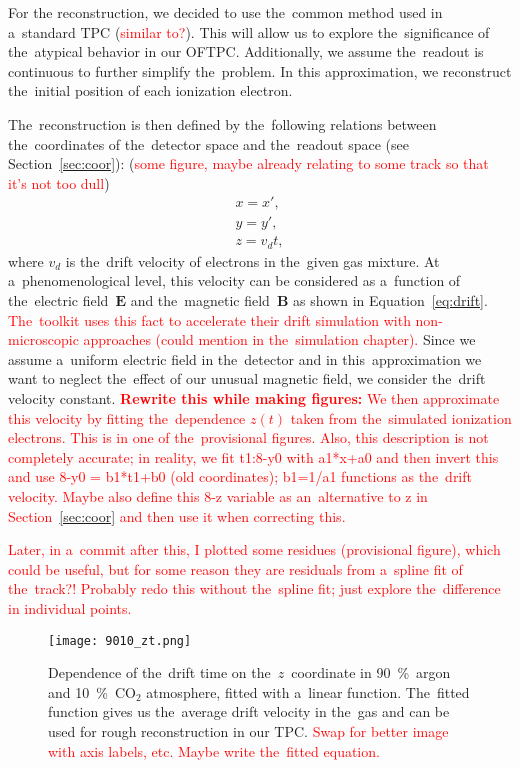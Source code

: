 		For the reconstruction, we decided to use the~common method used in a~standard \ac{TPC} (\textcolor{red}{similar to?}). This will allow us to explore the~significance of the~atypical behavior in our \ac{OFTPC}. Additionally, we assume the~readout is continuous to further simplify the~problem. In this approximation, we reconstruct the~initial position of each ionization electron.
		
		The~reconstruction is then defined by the~following relations between the~coordinates of the~detector space and the~readout space (see Section~\ref{sec:coor}): (\textcolor{red}{some figure, maybe already relating to some track so that it's not too dull})
			\begin{eqnarray}
				x = x',\\
				y = y',\\
				z = v_d t,
			\end{eqnarray}
		where $v_d$ is the~drift velocity of electrons in the~given gas mixture. At a~phenomenological level, this velocity can be considered as a~function of the~electric field~$\bm{E}$ and the~magnetic field~$\bm{B}$ as shown in Equation~\ref{eq:drift}. \textcolor{red}{The~\garfieldpp toolkit uses this fact to accelerate their drift simulation with non-microscopic approaches (could mention in the~simulation chapter).} Since we assume a~uniform electric field in the~detector and in this~approximation we want to neglect the~effect of our unusual magnetic field, we consider the~drift velocity constant. \textcolor{red}{\textbf{Rewrite this while making figures:} We then approximate this velocity by fitting the~dependence $z(t)$ taken from the~simulated ionization electrons. This is in one of the~provisional figures. Also, this description is not completely accurate; in reality, we fit t1:8-y0 with a1*x+a0 and then invert this and use 8-y0 = b1*t1+b0 (old coordinates); b1=1/a1 functions as the~drift velocity. Maybe also define this 8-z variable as an~alternative to z in Section~\ref{sec:coor} and then use it when correcting this.}
		
		\textcolor{red}{Later, in a~commit after this, I plotted some residues (provisional figure), which could be useful, but for some reason they are residuals from a~spline fit of the~track?! Probably redo this without the~spline fit; just explore the~difference in individual points.}
		
		\begin{figure}[H]
			\centering
			\texttt{[image: 9010\_zt.png]}
			\caption{Dependence of the~drift time on the~$z$~coordinate in 90~\%~argon and 10~\%~CO$_2$ atmosphere, fitted with a~linear function. The~fitted function gives us the~average drift velocity in the~gas and can be used for rough reconstruction in our \ac{TPC}. \textcolor{red}{Swap for better image with axis labels, etc. Maybe write the~fitted equation.}}
			\label{fig:9010zt}
		\end{figure}
		
